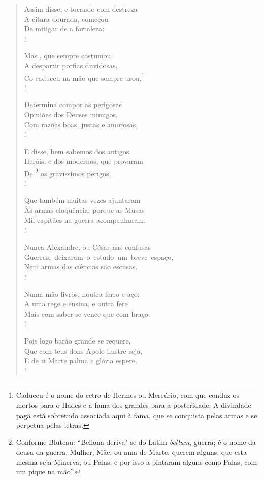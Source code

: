 \begin{verse}
Assim disse, e tocando com destreza\\
A cítara dourada, começou\\
De mitigar de  a fortaleza:\\!

Mas , que sempre costumou\\
A despartir porfias duvidosas,\\
Co caduceu na mão que sempre usou,\footnote{ Caduceu é o nome do cetro de
Hermes ou Mercúrio, com que conduz os mortos para o Hades e a fama dos
grandes para a posteridade. A divindade pagã está sobretudo associada
aqui à fama, que se conquista pelas armas e se perpetua pelas letras.}\\!

Determina compor as perigosas\\
Opiniões dos Deuses inimigos,\\
Com razões boas, justas e amorosas,\\! \EP[1]

E disse, bem sabemos dos antigos\\
Heróis, e dos modernos, que provaram\\
De \footnote{ Conforme Bluteau: ``Bellona deriva"-se do
Latim \textit{bellum}, guerra; é o nome da deusa da guerra, Mulher,
Mãe, ou ama de Marte; querem alguns, que esta mesma seja Minerva, ou
Palas, e por isso a pintaram alguns como Palas, com um pique na mão''.} os gravíssimos perigos,\\!

Que também muitas vezes ajuntaram\\
Às armas eloquência, porque as Musas\\
Mil capitães na guerra acompanharam:\\!

Nunca Alexandre, ou César nas confusas\\ 	 
\mbox{Guerras, deixaram o estudo um breve espaço,}\\
Nem armas das ciências são escusas.\\!

Numa mão livros, noutra ferro e aço:\\
A uma rege e ensina, e outra fere\\
Mais com saber se vence que com braço.\\!

Pois logo barão grande se requere,\\
Que com teus dons Apolo ilustre seja,\\
E de ti Marte palma e glória espere.\\!


\end{verse}
